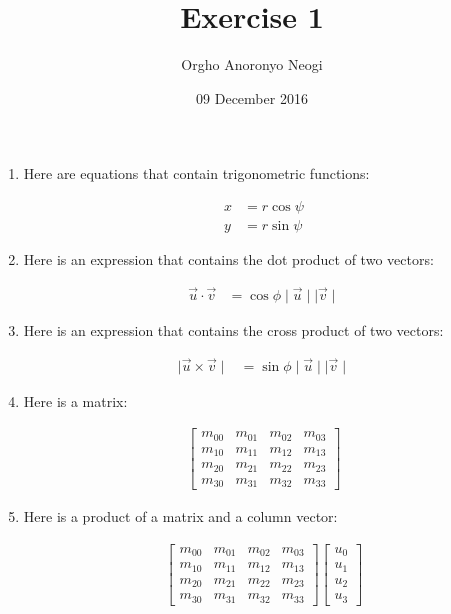 \documentclass[oneside]{article}
\title{Exercise 1}
\author{Orgho Anoronyo Neogi}
\date{09 December 2016}
\begin{document}
\maketitle

\begin{enumerate}
  \item Here are equations that contain trigonometric functions:

  \begin{align*}
    x & = r \cos \psi \\
    y & = r \sin \psi
    \end{align*}

  \item Here is an expression that contains the dot
    product of two vectors:

  \begin{align*}
    \vec{u} \cdot \vec{v} & = \cos \phi \mid \vec{u} \mid \mid \vec{v} \mid
    \end{align*}

  \item Here is an expression that contains the cross
    product of two vectors:

  \begin{align*}
    \mid \vec{u} \times \vec{v} \mid & =
        \sin \phi \mid \vec{u} \mid \mid \vec{v} \mid
    \end{align*}

  \item Here is a matrix:

  \begin{align*}
    \begin{bmatrix}
      m_{00} & m_{01} & m_{02} & m_{03} \\
      m_{10} & m_{11} & m_{12} & m_{13} \\
      m_{20} & m_{21} & m_{22} & m_{23} \\
      m_{30} & m_{31} & m_{32} & m_{33}
      \end{bmatrix}
    \end{align*}

  \item Here is a product of a matrix and a column vector:

  \begin{align*}
    \begin{bmatrix}
      m_{00} & m_{01} & m_{02} & m_{03} \\
      m_{10} & m_{11} & m_{12} & m_{13} \\
      m_{20} & m_{21} & m_{22} & m_{23} \\
      m_{30} & m_{31} & m_{32} & m_{33}
      \end{bmatrix}
    \begin{bmatrix}
      u_0 \\
      u_1 \\
      u_2 \\
      u_3
      \end{bmatrix}
    \end{align*}


\end{enumerate}
\end{document}
